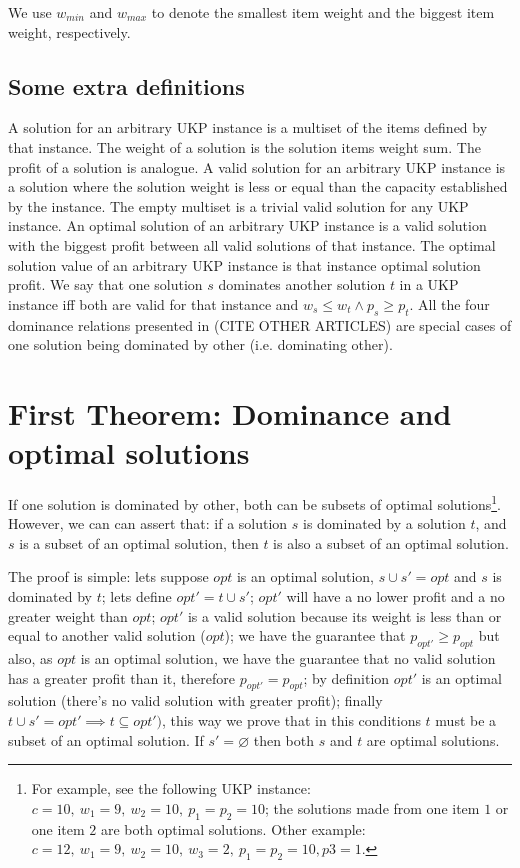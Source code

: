 \documentclass[12pt]{article}
\begin{document}
We use \(w_{min}\) and \(w_{max}\) to denote the smallest item weight and the biggest item weight, respectively.

\subsection{Some extra definitions}

A solution for an arbitrary UKP instance is a multiset of the items defined by that instance. The weight of a solution is the solution items weight sum. The profit of a solution is analogue. A valid solution for an arbitrary UKP instance is a solution where the solution weight is less or equal than the capacity established by the instance. The empty multiset is a trivial valid solution for any UKP instance. An optimal solution of an arbitrary UKP instance is a valid solution with the biggest profit between all valid solutions of that instance. The optimal solution value of an arbitrary UKP instance is that instance optimal solution profit. We say that one solution \(s\) dominates another solution \(t\) in a UKP instance iff both are valid for that instance and \(w_s \leq w_t \land p_s \geq p_t\). All the four dominance relations presented in (CITE OTHER ARTICLES) are special cases of one solution being dominated by other (i.e. dominating other).

\section{First Theorem: Dominance and optimal solutions}

If one solution is dominated by other, both can be subsets of optimal solutions\footnote{For example, see the following UKP instance: \(c = 10,~w_1 = 9,~w_2 = 10,~p_1 = p_2 = 10\); the solutions made from one item \(1\) or one item \(2\) are both optimal solutions. Other example: \(c = 12,~w_1 = 9,~w_2 = 10,~w_3 = 2,~p_1 = p_2 = 10, p3 = 1\).}. However, we can can assert that: if a solution \(s\) is dominated by a solution \(t\), and \(s\) is a subset of an optimal solution, then \(t\) is also a subset of an optimal solution.

The proof is simple: lets suppose \(opt\) is an optimal solution, \(s \cup s' = opt\) and \(s\) is dominated by \(t\); lets define \(opt' = t \cup s'\); \(opt'\) will have a no lower profit and a no greater weight than \(opt\); \(opt'\) is a valid solution because its weight is less than or equal to another valid solution (\(opt\)); we have the guarantee that \(p_{opt'} \geq p_{opt}\) but also, as \(opt\) is an optimal solution, we have the guarantee that no valid solution has a greater profit than it, therefore \(p_{opt'} = p_{opt}\); by definition \(opt'\) is an optimal solution (there's no valid solution with greater profit); finally \(t \cup s' = opt' \implies t \subseteq opt')\), this way we prove that in this conditions \(t\) must be a subset of an optimal solution. If \(s' = \varnothing\) then both \(s\) and \(t\) are optimal solutions.
\end{document}
